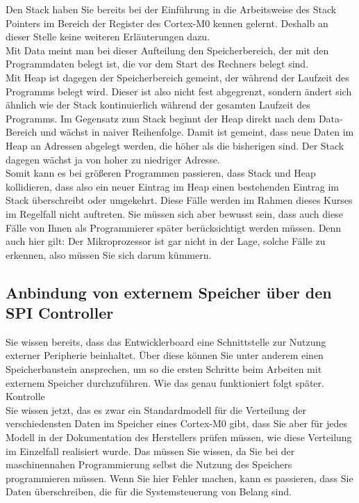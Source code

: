 Den Stack haben Sie bereits bei der Einführung in die Arbeitsweise des Stack Pointers im Bereich der Register des Cortex-M0 kennen gelernt. Deshalb an dieser Stelle keine weiteren Erläuterungen dazu.\\

Mit Data meint man bei dieser Aufteilung den Speicherbereich, der mit den Programmdaten belegt ist, die vor dem Start des Rechners belegt sind.\\

Mit Heap ist dagegen der Speicherbereich gemeint, der während der Laufzeit des Programms belegt wird. Dieser ist also nicht fest abgegrenzt, sondern ändert sich ähnlich wie der Stack kontinuierlich während der gesamten Laufzeit des Programms. Im Gegensatz zum Stack beginnt der Heap direkt nach dem Data-Bereich und wächst in naiver Reihenfolge. Damit ist gemeint, dass neue Daten im Heap an Adressen abgelegt werden, die höher als die bisherigen sind. Der Stack dagegen wächst ja von hoher zu niedriger Adresse.\\

Somit kann es bei größeren Programmen passieren, dass Stack und Heap kollidieren, dass also ein neuer Eintrag im Heap einen bestehenden Eintrag im Stack überschreibt oder umgekehrt. Diese Fälle werden im Rahmen dieses Kurses im Regelfall nicht auftreten. Sie müssen sich aber bewusst sein, dass auch diese Fälle von Ihnen als Programmierer später berücksichtigt werden müssen. Denn auch hier gilt: Der Mikroprozessor ist gar nicht in der Lage, solche Fälle zu erkennen, also müssen Sie sich darum kümmern.

\subsection{Anbindung von externem Speicher über den SPI Controller}

Sie wissen bereits, dass das Entwicklerboard eine Schnittstelle zur Nutzung externer Peripherie beinhaltet. Über diese können Sie unter anderem einen Speicherbaustein ansprechen, um so die ersten Schritte beim Arbeiten mit externem Speicher durchzuführen. Wie das genau funktioniert folgt später.\\

Kontrolle\\

Sie wissen jetzt, das es zwar ein Standardmodell für die Verteilung der verschiedensten Daten im Speicher eines Cortex-M0 gibt, dass Sie aber für jedes Modell in der Dokumentation des Herstellers prüfen müssen, wie diese Verteilung im Einzelfall realisiert wurde. Das müssen Sie wissen, da Sie bei der maschinennahen Programmierung selbst die Nutzung des Speichers programmieren müssen. Wenn Sie hier Fehler machen, kann es passieren, dass Sie Daten überschreiben, die für die Systemsteuerung von Belang sind.\\

